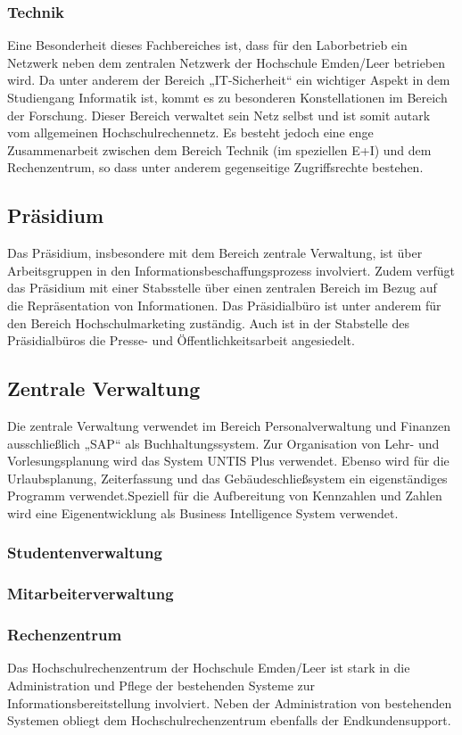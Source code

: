 \subsubsection{Technik}
Eine Besonderheit dieses Fachbereiches ist, dass für den Laborbetrieb ein Netzwerk neben dem zentralen Netzwerk der Hochschule Emden/Leer betrieben wird. Da unter anderem der Bereich „IT-Sicherheit“ ein wichtiger Aspekt in dem Studiengang Informatik ist, kommt es zu besonderen Konstellationen im Bereich der Forschung. Dieser Bereich verwaltet sein Netz selbst und ist somit autark vom allgemeinen Hochschulrechennetz. Es besteht jedoch eine enge Zusammenarbeit zwischen dem Bereich Technik (im speziellen E+I) und dem Rechenzentrum, so dass unter anderem gegenseitige Zugriffsrechte bestehen. 

\subsection{Präsidium}
Das Präsidium, insbesondere mit dem Bereich zentrale Verwaltung, ist über  Arbeitsgruppen in den Informationsbeschaffungsprozess involviert. Zudem verfügt das Präsidium mit einer Stabsstelle über einen zentralen Bereich im Bezug auf die Repräsentation von Informationen.  Das Präsidialbüro ist unter anderem für den Bereich Hochschulmarketing zuständig. Auch ist in der Stabstelle des Präsidialbüros die Presse- und Öffentlichkeitsarbeit angesiedelt.

\subsection{Zentrale Verwaltung}
Die zentrale Verwaltung verwendet im Bereich Personalverwaltung und Finanzen ausschließlich „SAP“ als Buchhaltungssystem. Zur Organisation von Lehr- und Vorlesungsplanung wird das System UNTIS Plus verwendet. Ebenso wird für die Urlaubsplanung, Zeiterfassung und das Gebäudeschließsystem ein eigenständiges Programm verwendet.Speziell für die Aufbereitung von Kennzahlen und Zahlen wird eine Eigenentwicklung als Business Intelligence System verwendet. 

\subsubsection{Studentenverwaltung}
\subsubsection{Mitarbeiterverwaltung}
\subsubsection{Rechenzentrum}
Das Hochschulrechenzentrum der Hochschule Emden/Leer ist stark in die Administration und Pflege der bestehenden Systeme zur Informationsbereitstellung involviert. Neben der Administration von bestehenden Systemen obliegt dem Hochschulrechenzentrum ebenfalls der Endkundensupport.


